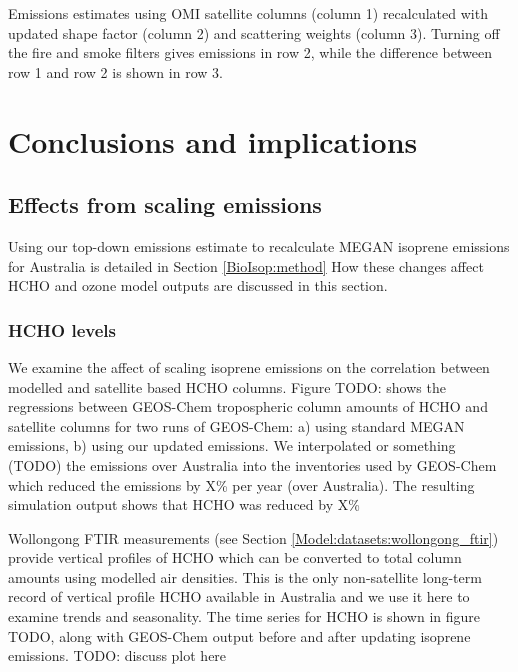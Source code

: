     {Emissions estimates using OMI satellite columns (column 1) recalculated with updated shape factor (column 2) and scattering weights (column 3). Turning off the fire and smoke filters gives emissions in row 2, while the difference between row 1 and row 2 is shown in row 3.}
    {\label{BioIsop:uncertainty:Fire:fig_emiss_without_fire_filter}}
    
    
    
    
\section{Conclusions and implications}
  \label{BioIsop:conclusions}
  
  
  
  \subsection{Effects from scaling emissions}
    \label{BioIsop:conclusions:scaled}
    Using our top-down emissions estimate to recalculate MEGAN isoprene emissions for Australia is detailed in Section \ref{BioIsop:method}
    How these changes affect HCHO and ozone model outputs are discussed in this section.
  
    \subsubsection{HCHO levels}
    
      We examine the affect of scaling isoprene emissions on the correlation between modelled and satellite based HCHO columns.
      Figure TODO: shows the regressions between GEOS-Chem tropospheric column amounts of HCHO and satellite columns for two runs of GEOS-Chem: a) using standard MEGAN emissions, b) using our updated emissions.
      We interpolated or something (TODO) the emissions over Australia into the inventories used by GEOS-Chem which reduced the emissions by X\% per year (over Australia).
      The resulting simulation output shows that HCHO was reduced by X\%
      
      Wollongong FTIR measurements (see Section \ref{Model:datasets:wollongong_ftir}) provide vertical profiles of HCHO which can be converted to total column amounts using modelled air densities.
      This is the only non-satellite long-term record of vertical profile HCHO available in Australia and we use it here to examine trends and seasonality.
      The time series for HCHO is shown in figure TODO, along with GEOS-Chem output before and after updating isoprene emissions.
      TODO: discuss plot here
              
